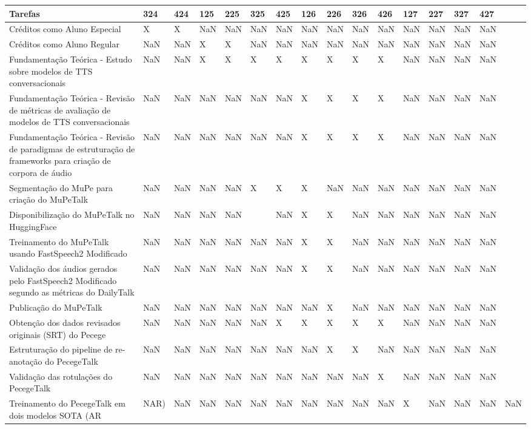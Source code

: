 \begin{tabular}{lllllllllllllll}
\toprule
Tarefas & 324 & 424 & 125 & 225 & 325 & 425 & 126 & 226 & 326 & 426 & 127 & 227 & 327 & 427 \\
\midrule
Créditos como Aluno Especial & X & X & NaN & NaN & NaN & NaN & NaN & NaN & NaN & NaN & NaN & NaN & NaN & NaN \\
Créditos como Aluno Regular & NaN & NaN & X & X & NaN & NaN & NaN & NaN & NaN & NaN & NaN & NaN & NaN & NaN \\
Fundamentação Teórica - Estudo sobre modelos de TTS conversacionais & NaN & NaN & X & X & X & X & X & X & X & X & NaN & NaN & NaN & NaN \\
Fundamentação Teórica - Revisão de métricas de avaliação de modelos de TTS conversacionais & NaN & NaN & NaN & NaN & NaN & NaN & X & X & X & X & NaN & NaN & NaN & NaN \\
Fundamentação Teórica - Revisão de paradigmas de estruturação de frameworks para criação de corpora de áudio & NaN & NaN & NaN & NaN & NaN & NaN & X & X & X & X & NaN & NaN & NaN & NaN \\
Segmentação do MuPe para criação do MuPeTalk & NaN & NaN & NaN & NaN & X & X & X & NaN & NaN & NaN & NaN & NaN & NaN & NaN \\
Disponibilização do MuPeTalk no HuggingFace & NaN & NaN & NaN & NaN &   & NaN & X & X & NaN & NaN & NaN & NaN & NaN & NaN \\
Treinamento do MuPeTalk usando FastSpeech2 Modificado & NaN & NaN & NaN & NaN & NaN & NaN & X & X & NaN & NaN & NaN & NaN & NaN & NaN \\
Validação dos áudios gerados pelo FastSpeech2 Modificado segundo as métricas do DailyTalk & NaN & NaN & NaN & NaN & NaN & NaN & X & X & NaN & NaN & NaN & NaN & NaN & NaN \\
Publicação do MuPeTalk & NaN & NaN & NaN & NaN & NaN & NaN & NaN & X & NaN & NaN & NaN & NaN & NaN & NaN \\
Obtenção dos dados revisados originais (SRT) do Pecege & NaN & NaN & NaN & NaN & NaN & X & X & X & X & X & NaN & NaN & NaN & NaN \\
Estruturação do pipeline de re-anotação do PecegeTalk & NaN & NaN & NaN & NaN & NaN & NaN & NaN & X & X & NaN & NaN & NaN & NaN & NaN \\
Validação das rotulações do PecegeTalk & NaN & NaN & NaN & NaN & NaN & NaN & NaN & NaN & NaN & X & NaN & NaN & NaN & NaN \\
Treinamento do PecegeTalk em dois modelos SOTA (AR & NAR) & NaN & NaN & NaN & NaN & NaN & NaN & NaN & NaN & NaN & X & NaN & NaN & NaN & NaN \\

\end{tabular}
